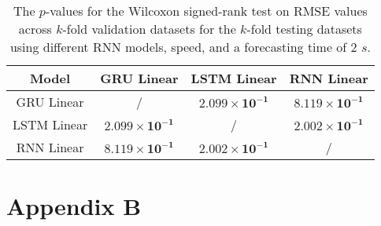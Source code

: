 \begin{table}[!ht]
	\centering
	\begin{tabular}{|c|c|c|c|}
		\hline
		Model & GRU Linear & LSTM Linear & RNN Linear \\ \hline
		GRU Linear & / & $\mathbf{2.099 \times 10^{-1}}$ & $\mathbf{8.119 \times 10^{-1}}$ \\ \hline
		LSTM Linear & $\mathbf{2.099 \times 10^{-1}}$ & / & $\mathbf{2.002 \times 10^{-1}}$ \\ \hline
		RNN Linear & $\mathbf{8.119 \times 10^{-1}}$ & $\mathbf{2.002 \times 10^{-1}}$ & / \\ \hline
	\end{tabular}
	\caption{The $p$-values for the Wilcoxon signed-rank test on RMSE values across $k$-fold validation datasets for the $k$-fold testing datasets using different RNN models, speed, and a forecasting time of $2$ $s$.}
	\label{tab:RMSE:speed:p:2}
\end{table}

\appendix
\section{Appendix B}
\label{appB}

